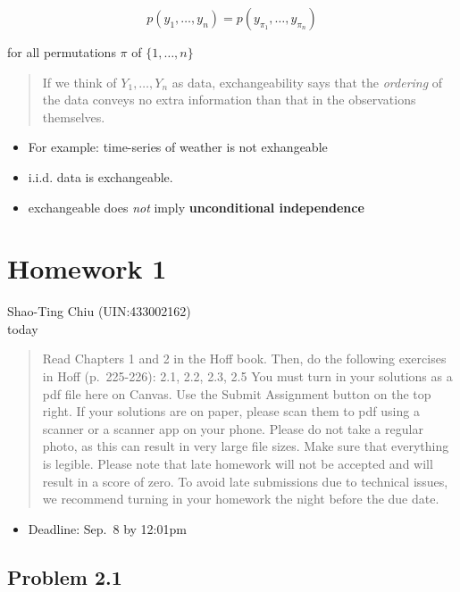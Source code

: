 \documentclass[
  letterpaper,
  DIV=11,
  numbers=noendperiod]{scrreprt}
\providecommand{\tightlist}{%
  \setlength{\itemsep}{0pt}\setlength{\parskip}{0pt}}\usepackage{longtable,booktabs,array}
\begin{document}
\[p(y_1,\dots,y_n) = p(y_{\pi_1},\dots,y_{\pi_n})\]

for all permutations \(\pi\) of \(\{1,\dots,n\}\)

\begin{quote}
If we think of \(Y_1,\dots,Y_n\) as data, exchangeability says that the
\emph{ordering} of the data conveys no extra information than that in
the observations themselves.
\end{quote}

\begin{itemize}
\item
  For example: time-series of weather is not exhangeable
\item
  i.i.d. data is exchangeable.
\item
  exchangeable does \emph{not} imply \textbf{unconditional independence}
\end{itemize}


\hypertarget{homework-1}{%
\chapter{Homework 1}\label{homework-1}}

Shao-Ting Chiu (UIN:433002162)\\
today

\hfill\break

\begin{quote}
Read Chapters 1 and 2 in the Hoff book. Then, do the following exercises
in Hoff (p.~225-226): 2.1, 2.2, 2.3, 2.5 You must turn in your solutions
as a pdf file here on Canvas. Use the Submit Assignment button on the
top right. If your solutions are on paper, please scan them to pdf using
a scanner or a scanner app on your phone. Please do not take a regular
photo, as this can result in very large file sizes. Make sure that
everything is legible. Please note that late homework will not be
accepted and will result in a score of zero. To avoid late submissions
due to technical issues, we recommend turning in your homework the night
before the due date.
\end{quote}

\begin{itemize}
\tightlist
\item
  Deadline: Sep.~8 by 12:01pm
\end{itemize}

\hypertarget{problem-2.1}{%
\section{Problem 2.1}\label{problem-2.1}}
\end{document}

